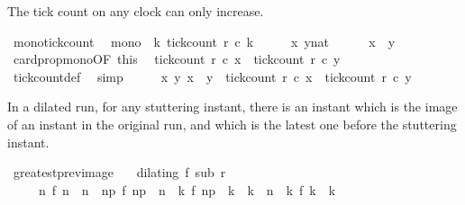 \begin{isabellebody}
\isanewline
{}\isamarkupfalse%
%
\endisatagproof
{\isafoldproof}%
%
\isadelimproof
%
\endisadelimproof
%
\begin{isamarkuptext}%
The tick count on any clock can only increase.%
\end{isamarkuptext}\isamarkuptrue%
\isamarkupfalse%
\ mono{\isacharunderscore}tick{\isacharunderscore}count{\isacharcolon}\isanewline
\ \ {\isacartoucheopen}mono\ {\isacharparenleft}{\isasymlambda}\ k{\isachardot}\ tick{\isacharunderscore}count\ r\ c\ k{\isacharparenright}{\isacartoucheclose}\isanewline
%
\isadelimproof
%
\endisadelimproof
%
\isatagproof
{}\isamarkupfalse%
\isanewline
\ \ \isacommand{{\isacharbraceleft}}\isamarkupfalse%
\ \isamarkupfalse%
\ x\ y{\isacharcolon}{\isacharcolon}nat\isanewline
\ \ \ \ \isamarkupfalse%
\ {\isacartoucheopen}x\ {\isasymle}\ y{\isacartoucheclose}\isanewline
\ \ \ \ \isamarkupfalse%
\ card{\isacharunderscore}prop{\isacharunderscore}mono{\isacharbrackleft}OF\ this{\isacharbrackright}\ \isamarkupfalse%
\ {\isacartoucheopen}tick{\isacharunderscore}count\ r\ c\ x\ {\isasymle}\ tick{\isacharunderscore}count\ r\ c\ y{\isacartoucheclose}\isanewline
\ \ \ \ \ \ \isamarkupfalse%
\ tick{\isacharunderscore}count{\isacharunderscore}def\ \isamarkupfalse%
\ simp\isanewline
\ \ \isacommand{{\isacharbraceright}}\isamarkupfalse%
\ \isamarkupfalse%
\ {\isacartoucheopen}{\isasymAnd}x\ y{\isachardot}\ x\ {\isasymle}\ y\ {\isasymLongrightarrow}\ tick{\isacharunderscore}count\ r\ c\ x\ {\isasymle}\ tick{\isacharunderscore}count\ r\ c\ y{\isacartoucheclose}\ \isacommand{{\isachardot}}\isamarkupfalse%
\isanewline
{}\isamarkupfalse%
%
\endisatagproof
{\isafoldproof}%
%
\isadelimproof
%
\endisadelimproof
%
\begin{isamarkuptext}%
In a dilated run, for any stuttering instant, there is an instant which is the 
  image of an instant in the original run, and which is the latest one before
  the stuttering instant.%
\end{isamarkuptext}\isamarkuptrue%
\isamarkupfalse%
\ greatest{\isacharunderscore}prev{\isacharunderscore}image{\isacharcolon}\isanewline
\ \ \ {\isacartoucheopen}dilating\ f\ sub\ r{\isacartoucheclose}\isanewline
\ \ \ \ \ {\isacartoucheopen}{\isacharparenleft}{\isasymnexists}n\ f\ n\ {\isacharequal}\ n{\isacharparenright}\ {\isasymLongrightarrow}\ {\isacharparenleft}{\isasymexists}n\isactrlsub p{\isachardot}\ f\ n\isactrlsub p\ {\isacharless}\ n\ {\isasymand}\ {\isacharparenleft}{\isasymforall}k{\isachardot}\ f\ n\isactrlsub p\ {\isacharless}\ k\ {\isasymand}\ k\ {\isasymle}\ n\ {\isasymlongrightarrow}\ {\isacharparenleft}{\isasymnexists}k\ f\ k\ {\isacharequal}\ k{\isacharparenright}{\isacharparenright}{\isacharparenright}{\isacartoucheclose}\isanewline

\end{isabellebody}
